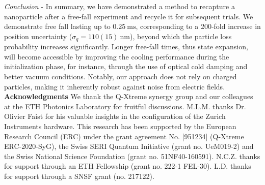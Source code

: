 \documentclass[twocolumn,preprintnumbers,superscriptaddress,amsmath,amssymb,aps,pra,10pt]{revtex4-1}
\newcommand{\<}{\langle}
\renewcommand{\>}{\rangle}
\renewcommand{\>}{\rangle}
\begin{document}
\textit{Conclusion} - In summary, we have demonstrated a method to recapture a nanoparticle after a free-fall experiment and recycle it for subsequent trials.
%
We demonstrate free fall lasting up to  $0.25~\mathrm{ms}$, corresponding to a 200-fold increase in position uncertainty ($\sigma_q=110(15)~\mathrm{nm}$), beyond which the particle loss probability increases significantly.
%
Longer free-fall times, thus state expansion, will become accessible by improving the cooling performance during the initialization phase, for instance, through the use of optical cold damping \cite{kamba2022optical} and better vacuum conditions.
%
Notably, our approach does not rely on charged particles, making it inherently robust against noise from electric fields.\\

\textbf{Acknowledgments} We thank the Q-Xtreme synergy group and our colleagues at the ETH Photonics Laboratory for fruitful discussions. M.L.M. thanks Dr. Olivier Faist for his valuable insights in the configuration of the Zurich Instruments hardware. This research has been supported by the European Research Council (ERC) under the grant agreement No. [951234] (Q-Xtreme ERC-2020-SyG), the Swiss SERI Quantum Initiative (grant no. UeM019-2) and the Swiss National Science Foundation (grant no. 51NF40-160591). N.C.Z. thanks for support through an ETH Fellowship (grant no. 222-1 FEL-30). L.D. thanks for support through a SNSF grant (no. 217122).








 
\end{document}
